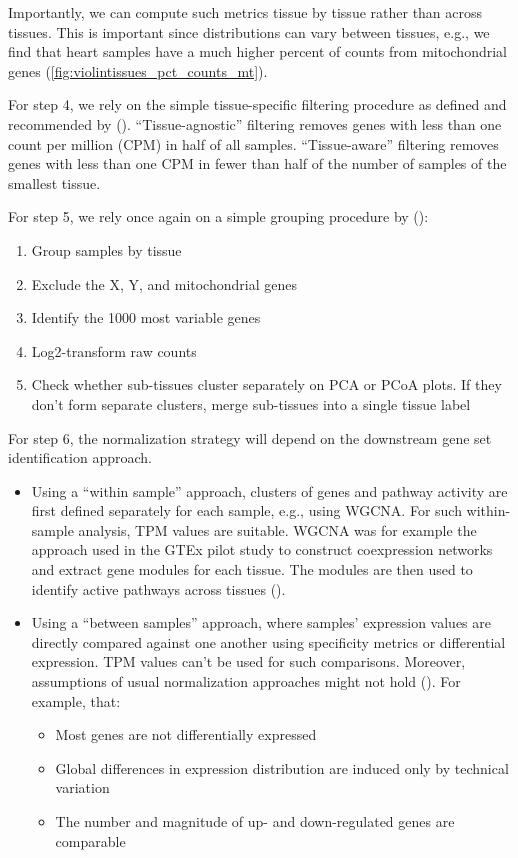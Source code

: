\documentclass{article}
\begin{document}
Importantly, we can compute such metrics tissue by tissue rather than across tissues. This is important since distributions can vary between tissues, e.g., we find that heart samples have a much higher percent of counts from mitochondrial genes (\ref{fig:violintissues_pct_counts_mt}).

For step 4, we rely on the simple tissue-specific filtering procedure as defined and recommended by (\cite{Paulson2017-jv}). “Tissue-agnostic” filtering removes genes with less than one count per million (CPM) in half of all samples. “Tissue-aware” filtering removes genes with less than one CPM in fewer than half of the number of samples of the smallest tissue.

For step 5, we rely once again on a simple grouping procedure by (\cite{Paulson2017-jv}):
\begin{enumerate}
  \item Group samples by tissue
  \item Exclude the X, Y, and mitochondrial genes
  \item Identify the 1000 most variable genes
  \item Log2-transform raw counts
  \item Check whether sub-tissues cluster separately on PCA or PCoA plots. If they don't form separate clusters, merge sub-tissues into a single tissue label
\end{enumerate}

For step 6, the normalization strategy will depend on the downstream gene set identification approach.
\begin{itemize}
  \item Using a “within sample” approach, clusters of genes and pathway activity are first defined separately for each sample, e.g., using WGCNA. For such within-sample analysis, TPM values are suitable. WGCNA was for example the approach used in the GTEx pilot study to construct coexpression networks and extract gene modules for each tissue. The  modules are then used to identify active pathways across tissues (\cite{GTEx-Consortium2015-te}).
  \item Using a “between samples” approach, where samples' expression values are directly compared against one another using specificity metrics or differential expression. TPM values can't be used for such comparisons. Moreover, assumptions of usual normalization approaches might not hold (\cite{Paulson2017-jv}). For example, that:
  \begin{itemize}
    \item Most genes are not differentially expressed
    \item Global differences in expression distribution are induced only by technical variation
    \item The number and magnitude of up- and down-regulated genes are comparable
  \end{itemize}
\end{itemize}
\end{document}
